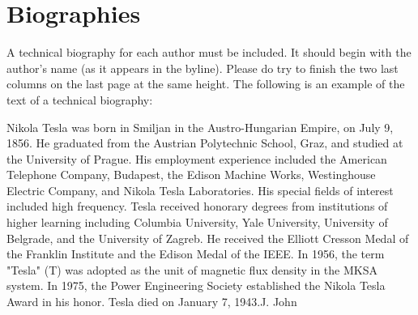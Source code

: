 \documentclass[a4paper]{IEEEtran}
\begin{document}
\section{Biographies}
A technical biography for each author must be included. It should begin with the author’s name (as it appears in the byline). Please do try to finish the two last columns on the last page at the same height. The following is an example of the text of a technical biography:
\begin{IEEEbiographynophoto}{Nikola Tesla}
 was born in Smiljan in the Austro-Hungarian Empire, on July 9, 1856. He graduated from the Austrian Polytechnic School, Graz, and studied at the University of Prague.
His employment experience included the American Telephone Company, Budapest, the Edison Machine Works, Westinghouse Electric Company, and Nikola Tesla Laboratories. His special fields of interest included high frequency.
Tesla received honorary degrees from institutions of higher learning including Columbia University, Yale University, University of Belgrade, and the University of Zagreb. He received the Elliott Cresson Medal of the Franklin Institute and the Edison Medal of the IEEE. In 1956, the term "Tesla" (T) was adopted as the unit of magnetic flux density in the MKSA system. In 1975, the Power Engineering Society established the Nikola Tesla Award in his honor. Tesla died on January 7, 1943.J. John
\end{IEEEbiographynophoto}
\end{document}
